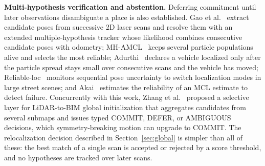 \textbf{Multi-hypothesis verification and abstention.}
Deferring commitment until later observations disambiguate a place is
also established. Gao et al.~\cite{gao2019global} extract candidate
poses from successive 2D laser scans and resolve them with an extended
multiple-hypothesis tracker whose likelihood combines consecutive
candidate poses with odometry; MH-AMCL~\cite{garcia2023mhamcl} keeps
several particle populations alive and selects the most reliable;
Adurthi~\cite{adurthi2023scan} declares a vehicle localized only after
the particle spread stays small over consecutive scans and the vehicle
has moved; Reliable-loc~\cite{zou2024reliableloc} monitors sequential
pose uncertainty to switch localization modes in large street scenes;
and Akai~\cite{akai2023reliable} estimates the reliability of an MCL
estimate to detect failure. Concurrently with this work, Zhang et
al.~\cite{zhang2026movefirst} proposed a selective layer for
LiDAR-to-BIM global initialization that aggregates candidates from
several submaps and issues typed COMMIT, DEFER, or AMBIGUOUS decisions,
which symmetry-breaking motion can upgrade to COMMIT. The relocalization
decision described in Section~\ref{sec:global} is simpler than all of
these: the best match of a single scan is accepted or rejected by a
score threshold, and no hypotheses are tracked over later scans.


